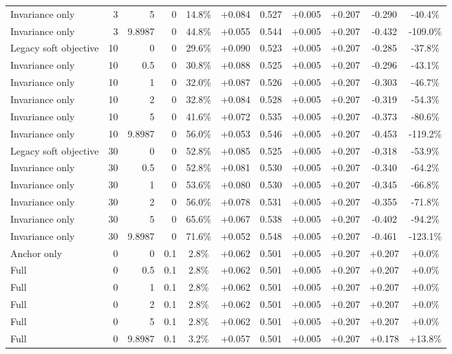 \begin{table}[htbp]
\begin{tabular}{lrrrccccccc}
Invariance only & 3 & 5 & 0 & 14.8\% & +0.084 & 0.527 & +0.005 & +0.207 & -0.290 & -40.4\% \\
Invariance only & 3 & 9.8987 & 0 & 44.8\% & +0.055 & 0.544 & +0.005 & +0.207 & -0.432 & -109.0\% \\
Legacy soft objective & 10 & 0 & 0 & 29.6\% & +0.090 & 0.523 & +0.005 & +0.207 & -0.285 & -37.8\% \\
Invariance only & 10 & 0.5 & 0 & 30.8\% & +0.088 & 0.525 & +0.005 & +0.207 & -0.296 & -43.1\% \\
Invariance only & 10 & 1 & 0 & 32.0\% & +0.087 & 0.526 & +0.005 & +0.207 & -0.303 & -46.7\% \\
Invariance only & 10 & 2 & 0 & 32.8\% & +0.084 & 0.528 & +0.005 & +0.207 & -0.319 & -54.3\% \\
Invariance only & 10 & 5 & 0 & 41.6\% & +0.072 & 0.535 & +0.005 & +0.207 & -0.373 & -80.6\% \\
Invariance only & 10 & 9.8987 & 0 & 56.0\% & +0.053 & 0.546 & +0.005 & +0.207 & -0.453 & -119.2\% \\
Legacy soft objective & 30 & 0 & 0 & 52.8\% & +0.085 & 0.525 & +0.005 & +0.207 & -0.318 & -53.9\% \\
Invariance only & 30 & 0.5 & 0 & 52.8\% & +0.081 & 0.530 & +0.005 & +0.207 & -0.340 & -64.2\% \\
Invariance only & 30 & 1 & 0 & 53.6\% & +0.080 & 0.530 & +0.005 & +0.207 & -0.345 & -66.8\% \\
Invariance only & 30 & 2 & 0 & 56.0\% & +0.078 & 0.531 & +0.005 & +0.207 & -0.355 & -71.8\% \\
Invariance only & 30 & 5 & 0 & 65.6\% & +0.067 & 0.538 & +0.005 & +0.207 & -0.402 & -94.2\% \\
Invariance only & 30 & 9.8987 & 0 & 71.6\% & +0.052 & 0.548 & +0.005 & +0.207 & -0.461 & -123.1\% \\
Anchor only & 0 & 0 & 0.1 & 2.8\% & +0.062 & 0.501 & +0.005 & +0.207 & +0.207 & +0.0\% \\
Full & 0 & 0.5 & 0.1 & 2.8\% & +0.062 & 0.501 & +0.005 & +0.207 & +0.207 & +0.0\% \\
Full & 0 & 1 & 0.1 & 2.8\% & +0.062 & 0.501 & +0.005 & +0.207 & +0.207 & +0.0\% \\
Full & 0 & 2 & 0.1 & 2.8\% & +0.062 & 0.501 & +0.005 & +0.207 & +0.207 & +0.0\% \\
Full & 0 & 5 & 0.1 & 2.8\% & +0.062 & 0.501 & +0.005 & +0.207 & +0.207 & +0.0\% \\
Full & 0 & 9.8987 & 0.1 & 3.2\% & +0.057 & 0.501 & +0.005 & +0.207 & +0.178 & +13.8\% \\

\end{tabular}
\end{table}
